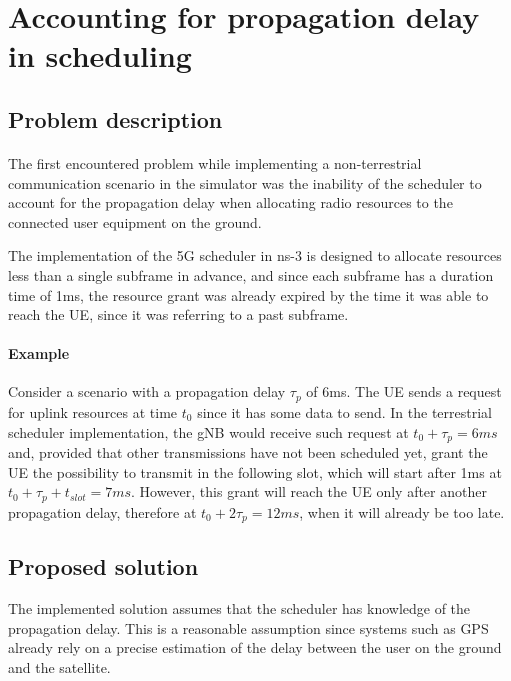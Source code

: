 \section{Accounting for propagation delay in scheduling}

\subsection{Problem description}
\label{ss:propdelay-problem-desc}
\paragraph{}
The first encountered problem while implementing a non-terrestrial communication scenario in the simulator was the inability of the scheduler to account for the propagation delay when allocating radio resources to the connected user equipment on the ground.

The implementation of the 5G scheduler in ns-3 is designed to allocate resources less than a single subframe in advance, and since each subframe has a duration time of 1ms, the resource grant was already expired by the time it was able to reach the \ac{UE}, since it was referring to a past subframe.

\paragraph{Example} Consider a scenario with a propagation delay $\tau_p$ of 6ms. The \ac{UE} sends a request for uplink resources at time $t_0$ since it has some data to send. In the terrestrial scheduler implementation, the \ac{gNB} would receive such request at $t_0+\tau_p=6\textit{ms}$ and, provided that other transmissions have not been scheduled yet, grant the \ac{UE} the possibility to transmit in the following slot, which will start after 1ms at $t_0+\tau_p+t_{\textit{slot}}=7\textit{ms}$. However, this grant will reach the \ac{UE} only after another propagation delay, therefore at $t_0+2\tau_p=12\textit{ms}$, when it will already be too late.

\subsection{Proposed solution}
The implemented solution assumes that the scheduler has knowledge of the propagation delay. This is a reasonable assumption since systems such as GPS already rely on a precise estimation of the delay between the user on the ground and the satellite.

